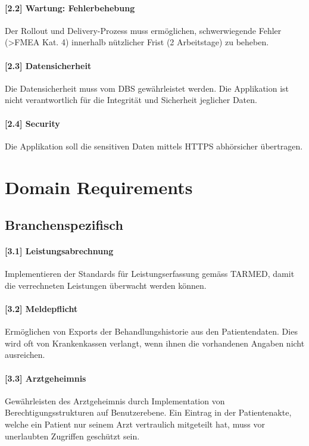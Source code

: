 \documentclass[a4paper]{scrreprt}
\begin{document}
\paragraph{[2.2] Wartung: Fehlerbehebung}
Der Rollout und Delivery-Prozess muss ermöglichen, schwerwiegende Fehler (\textgreater FMEA Kat. 4) innerhalb nützlicher Frist (2 Arbeitstage) zu beheben.

\paragraph{[2.3] Datensicherheit}
Die Datensicherheit muss vom DBS gewährleistet werden. Die Applikation ist nicht verantwortlich für die Integrität und Sicherheit jeglicher Daten.
 
\paragraph{[2.4] Security}
Die Applikation soll die sensitiven Daten mittels HTTPS abhörsicher übertragen. 

\section{Domain Requirements}
\subsection{Branchenspezifisch}
\paragraph{[3.1] Leistungsabrechnung} Implementieren der Standards für Leistungserfassung gemäss TARMED, damit die verrechneten Leistungen überwacht werden können.

\paragraph{[3.2] Meldepflicht} Ermöglichen von Exports der Behandlungshistorie aus den Patientendaten. Dies wird oft von Krankenkassen verlangt, wenn ihnen die vorhandenen Angaben nicht ausreichen.

\paragraph{[3.3] Arztgeheimnis} Gewährleisten des Arztgeheimnis durch Implementation von Berechtigungsstrukturen auf Benutzerebene. Ein Eintrag in der Patientenakte, welche ein Patient nur seinem Arzt vertraulich mitgeteilt hat, muss vor unerlaubten Zugriffen geschützt sein.
\end{document}
